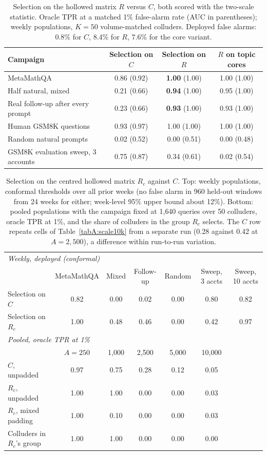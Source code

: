\begin{table}[h]
\centering
\caption{Selection on the hollowed matrix $R$ versus $C$, both scored with the two-scale statistic. Oracle TPR at a matched 1\% false-alarm rate (AUC in parentheses); weekly populations, $K=50$ volume-matched colluders. Deployed false alarms: 0.8\% for $C$, 8.4\% for $R$, 7.6\% for the core variant.}
\label{tabA:hollow}
\small
\begin{tabular}{lccc}
\toprule
Campaign & Selection on $C$ & Selection on $R$ & $R$ on topic cores \\
\midrule
MetaMathQA & 0.86 (0.92) & \textbf{1.00} (1.00) & 1.00 (1.00) \\
Half natural, mixed & 0.21 (0.66) & \textbf{0.94} (1.00) & 0.95 (1.00) \\
Real follow-up after every prompt & 0.23 (0.66) & \textbf{0.93} (1.00) & 0.93 (1.00) \\
Human GSM8K questions & 0.93 (0.97) & 1.00 (1.00) & 1.00 (1.00) \\
Random natural prompts & 0.02 (0.52) & 0.00 (0.51) & 0.00 (0.48) \\
GSM8K evaluation sweep, 3 accounts & 0.75 (0.87) & 0.34 (0.61) & 0.02 (0.54) \\
\bottomrule
\end{tabular}
\end{table}
\begin{table}[h]
\centering
\caption{Selection on the centred hollowed matrix $R_c$ against $C$. Top: weekly populations, conformal thresholds over all prior weeks (no false alarm in 960 held-out windows from 24 weeks for either; week-level 95\% upper bound about 12\%). Bottom: pooled populations with the campaign fixed at 1{,}640 queries over 50 colluders, oracle TPR at 1\%, and the share of colluders in the group $R_c$ selects. The $C$ row repeats cells of Table~\ref{tabA:scale10k} from a separate run (0.28 against 0.42 at $A=2{,}500$), a difference within run-to-run variation.}
\label{tabA:hollow2}
\small
\begin{tabular}{lcccccc}
\toprule
\multicolumn{7}{l}{\emph{Weekly, deployed (conformal)}} \\
& MetaMathQA & Mixed & Follow-up & Random & Sweep, 3 accts & Sweep, 10 accts \\
Selection on $C$ & 0.82 & 0.00 & 0.02 & 0.00 & 0.80 & 0.82 \\
Selection on $R_c$ & 1.00 & 0.48 & 0.46 & 0.00 & 0.42 & 0.97 \\
\midrule
\multicolumn{7}{l}{\emph{Pooled, oracle TPR at 1\%}} \\
& $A=250$ & 1{,}000 & 2{,}500 & 5{,}000 & 10{,}000 & \\
$C$, unpadded & 0.97 & 0.75 & 0.28 & 0.12 & 0.05 & \\
$R_c$, unpadded & 1.00 & 1.00 & 0.00 & 0.00 & 0.03 & \\
$R_c$, mixed padding & 1.00 & 0.10 & 0.00 & 0.00 & 0.03 & \\
Colluders in $R_c$'s group & 1.00 & 1.00 & 0.00 & 0.00 & 0.00 & \\
\bottomrule
\end{tabular}
\end{table}

